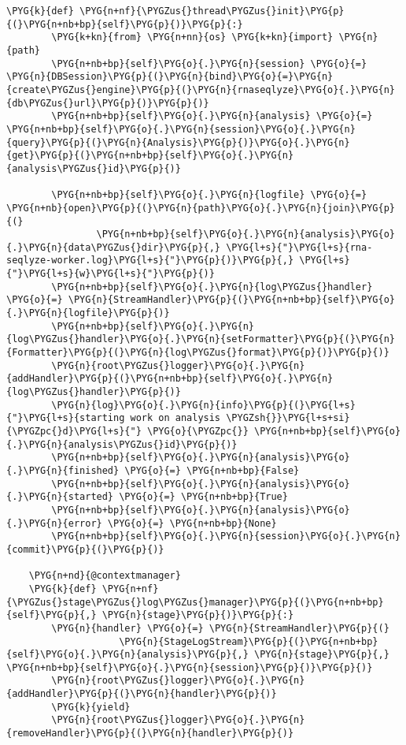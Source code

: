 \begin{Verbatim}[commandchars=\\\{\}]
    \PYG{k}{def} \PYG{n+nf}{\PYGZus{}thread\PYGZus{}init}\PYG{p}{(}\PYG{n+nb+bp}{self}\PYG{p}{)}\PYG{p}{:}
        \PYG{k+kn}{from} \PYG{n+nn}{os} \PYG{k+kn}{import} \PYG{n}{path}
        \PYG{n+nb+bp}{self}\PYG{o}{.}\PYG{n}{session} \PYG{o}{=} \PYG{n}{DBSession}\PYG{p}{(}\PYG{n}{bind}\PYG{o}{=}\PYG{n}{create\PYGZus{}engine}\PYG{p}{(}\PYG{n}{rnaseqlyze}\PYG{o}{.}\PYG{n}{db\PYGZus{}url}\PYG{p}{)}\PYG{p}{)}
        \PYG{n+nb+bp}{self}\PYG{o}{.}\PYG{n}{analysis} \PYG{o}{=} \PYG{n+nb+bp}{self}\PYG{o}{.}\PYG{n}{session}\PYG{o}{.}\PYG{n}{query}\PYG{p}{(}\PYG{n}{Analysis}\PYG{p}{)}\PYG{o}{.}\PYG{n}{get}\PYG{p}{(}\PYG{n+nb+bp}{self}\PYG{o}{.}\PYG{n}{analysis\PYGZus{}id}\PYG{p}{)}

        \PYG{n+nb+bp}{self}\PYG{o}{.}\PYG{n}{logfile} \PYG{o}{=} \PYG{n+nb}{open}\PYG{p}{(}\PYG{n}{path}\PYG{o}{.}\PYG{n}{join}\PYG{p}{(}
                \PYG{n+nb+bp}{self}\PYG{o}{.}\PYG{n}{analysis}\PYG{o}{.}\PYG{n}{data\PYGZus{}dir}\PYG{p}{,} \PYG{l+s}{"}\PYG{l+s}{rna-seqlyze-worker.log}\PYG{l+s}{"}\PYG{p}{)}\PYG{p}{,} \PYG{l+s}{"}\PYG{l+s}{w}\PYG{l+s}{"}\PYG{p}{)}
        \PYG{n+nb+bp}{self}\PYG{o}{.}\PYG{n}{log\PYGZus{}handler} \PYG{o}{=} \PYG{n}{StreamHandler}\PYG{p}{(}\PYG{n+nb+bp}{self}\PYG{o}{.}\PYG{n}{logfile}\PYG{p}{)}
        \PYG{n+nb+bp}{self}\PYG{o}{.}\PYG{n}{log\PYGZus{}handler}\PYG{o}{.}\PYG{n}{setFormatter}\PYG{p}{(}\PYG{n}{Formatter}\PYG{p}{(}\PYG{n}{log\PYGZus{}format}\PYG{p}{)}\PYG{p}{)}
        \PYG{n}{root\PYGZus{}logger}\PYG{o}{.}\PYG{n}{addHandler}\PYG{p}{(}\PYG{n+nb+bp}{self}\PYG{o}{.}\PYG{n}{log\PYGZus{}handler}\PYG{p}{)}
        \PYG{n}{log}\PYG{o}{.}\PYG{n}{info}\PYG{p}{(}\PYG{l+s}{"}\PYG{l+s}{starting work on analysis \PYGZsh{}}\PYG{l+s+si}{\PYGZpc{}d}\PYG{l+s}{"} \PYG{o}{\PYGZpc{}} \PYG{n+nb+bp}{self}\PYG{o}{.}\PYG{n}{analysis\PYGZus{}id}\PYG{p}{)}
        \PYG{n+nb+bp}{self}\PYG{o}{.}\PYG{n}{analysis}\PYG{o}{.}\PYG{n}{finished} \PYG{o}{=} \PYG{n+nb+bp}{False}
        \PYG{n+nb+bp}{self}\PYG{o}{.}\PYG{n}{analysis}\PYG{o}{.}\PYG{n}{started} \PYG{o}{=} \PYG{n+nb+bp}{True}
        \PYG{n+nb+bp}{self}\PYG{o}{.}\PYG{n}{analysis}\PYG{o}{.}\PYG{n}{error} \PYG{o}{=} \PYG{n+nb+bp}{None}
        \PYG{n+nb+bp}{self}\PYG{o}{.}\PYG{n}{session}\PYG{o}{.}\PYG{n}{commit}\PYG{p}{(}\PYG{p}{)}

    \PYG{n+nd}{@contextmanager}
    \PYG{k}{def} \PYG{n+nf}{\PYGZus{}stage\PYGZus{}log\PYGZus{}manager}\PYG{p}{(}\PYG{n+nb+bp}{self}\PYG{p}{,} \PYG{n}{stage}\PYG{p}{)}\PYG{p}{:}
        \PYG{n}{handler} \PYG{o}{=} \PYG{n}{StreamHandler}\PYG{p}{(}
                    \PYG{n}{StageLogStream}\PYG{p}{(}\PYG{n+nb+bp}{self}\PYG{o}{.}\PYG{n}{analysis}\PYG{p}{,} \PYG{n}{stage}\PYG{p}{,} \PYG{n+nb+bp}{self}\PYG{o}{.}\PYG{n}{session}\PYG{p}{)}\PYG{p}{)}
        \PYG{n}{root\PYGZus{}logger}\PYG{o}{.}\PYG{n}{addHandler}\PYG{p}{(}\PYG{n}{handler}\PYG{p}{)}
        \PYG{k}{yield}
        \PYG{n}{root\PYGZus{}logger}\PYG{o}{.}\PYG{n}{removeHandler}\PYG{p}{(}\PYG{n}{handler}\PYG{p}{)}


\end{Verbatim}
